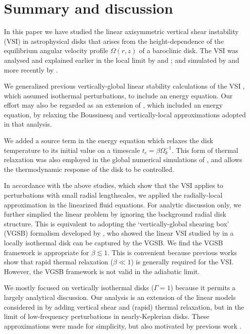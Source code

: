 \section{Summary and discussion}
In this paper we have studied the linear axisymmetric vertical shear
instability (VSI) in astrophysical disks that arises from the
height-dependence of the equilibrium angular velocity profile
$\Omega(r,z)$ of a baroclinic disk. The VSI was analysed and
explained earlier in the local limit by \cite{urpin98} and
\cite{urpin03}; and simulated by \cite{arlt04} and more recently by
\cite{nelson13}.     

We generalized previous vertically-global linear stability calculations
of the VSI \citep{nelson13,mcnally14}, which assumed isothermal
perturbations, to include an energy equation. Our effort may also be
regarded as an extension of \cite{urpin03}, which included an energy
equation, by relaxing the Boussinesq and vertically-local
approximations adopted in that analysis.    

We added a source term in the energy equation which relaxes the disk
temperature to its initial value on a timescale $t_c=\beta\Omega_k^{-1}$. This
form of thermal relaxation was also employed in the global numerical
simulations of \cite{nelson13}, and allows the thermodynamic response
of the disk to be controlled.  

In accordance with the above studies, which show that the VSI applies
to perturbations with small radial lengthscales, we applied the 
radially-local approximation in the linearized fluid equations. For
analytic discussion only, we further simplied the linear problem by
ignoring the background radial disk structure. This is equivalent to adopting
the `vertically-global shearing box' (VGSB) formalism developed by
\cite{mcnally14}, who showed the linear VSI studied by
\cite{nelson13} in a locally isothermal disk can be captured by the
VGSB. We find the VGSB framework is appropriate for $\beta\lesssim1$. 
This is convenient because previous works show that rapid thermal
relaxation ($\beta\ll1$) is generally required for the VSI. However,
the VGSB framework is not valid in the adiabatic limit. 
   

We mostly focused on vertically isothermal disks ($\Gamma=1$) because
it permits a largely analytical discussion. Our analysis is an
extension of the linear models considered in \cite{lubow93} by
adding vertical shear and (rapid) thermal relaxation, but in the limit of low-frequency
perturbations in nearly-Keplerian disks. These approximations were
made for simplicity, but also motivated by previous work
\citep{nelson13}.   

